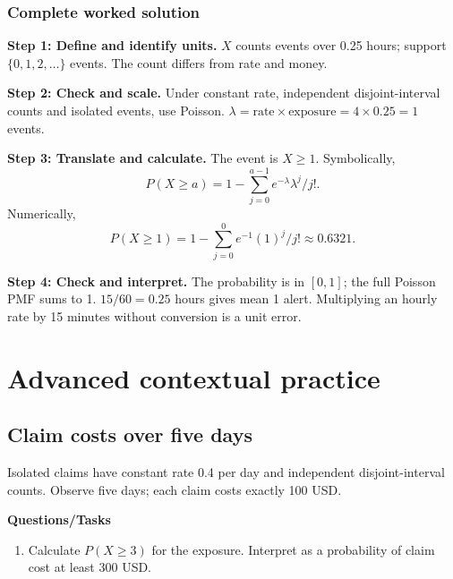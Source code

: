 \subsubsection*{Complete worked solution}
\par\noindent\begin{minipage}{\linewidth}
\textbf{Step 1: Define and identify units.} $X$ counts events over 0.25 hours; support $\{0,1,2,\ldots\}$ events. The count differs from rate and money.
\end{minipage}\par\medskip
\par\noindent\begin{minipage}{\linewidth}
\textbf{Step 2: Check and scale.} Under constant rate, independent disjoint-interval counts and isolated events, use Poisson. $\lambda=\text{rate}\times\text{exposure}=4\times0.25=1$ events.
\end{minipage}\par\medskip
\par\noindent\begin{minipage}{\linewidth}
\textbf{Step 3: Translate and calculate.} The event is $ X\geq1$. Symbolically,
\[P(X\geq a)=1-\sum_{j=0}^{a-1}e^{-\lambda}\lambda^j/j!.\]
Numerically,
\[P(X\geq1)=1-\sum_{j=0}^{0}e^{-1}(1)^j/j!\approx 0.6321.\]
\end{minipage}\par\medskip
\par\noindent\begin{minipage}{\linewidth}
\textbf{Step 4: Check and interpret.} The probability is in $[0,1]$; the full Poisson PMF sums to 1. $15/60=0.25$ hours gives mean 1 alert. Multiplying an hourly rate by 15 minutes without conversion is a unit error.
\end{minipage}\par\medskip
{}
\section{Advanced contextual practice}\label{sec:t2-c7-advanced}
\subsection{Claim costs over five days}
Isolated claims have constant rate 0.4 per day and independent disjoint-interval counts. Observe five days; each claim costs exactly 100 USD.

\textbf{Questions/Tasks}
\begin{enumerate}
\item Calculate $P(X\geq3)$ for the exposure. Interpret as a probability of claim cost at least 300 USD.
\end{enumerate}
